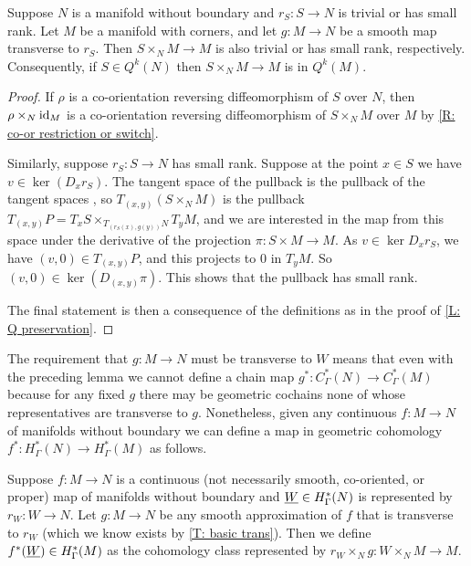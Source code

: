 \begin{lemma}\label{L: pullback map Q}
	Suppose $N$ is a manifold without boundary and $r_S:S \to N$ is trivial or has small rank. Let $M$ be a manifold with corners, and let $g: M \to N$ be a smooth map transverse to $r_S$. Then $S \times_N M \to M$ is also trivial or has small rank, respectively. Consequently, if $S \in Q^k(N)$ then $S \times_N M \to M$ is in $Q^k(M)$.
\end{lemma}

\begin{proof}
	If $\rho$ is a co-orientation reversing diffeomorphism of $S$ over $N$, then $\rho \times_N \mathrm{id}_M$ is a co-orientation reversing diffeomorphism of $S \times_N M$ over $M$ by \cref{R: co-or restriction or switch}.

	Similarly, suppose $r_S:S \to N$ has small rank. Suppose at the point $x \in S$ we have $v \in \ker(D_x r_S)$. The tangent space of the pullback is the pullback of the tangent spaces \cite[Theorem 5.47]{Wed16}, so $T_{(x,y)}(S \times_N M)$ is the pullback $T_{(x,y)}P = T_xS\times_{T_{(r_S(x),g(y))}N} T_y M$, and we are interested in the map from this space under the derivative of the projection $\pi:S \times M \to M$. As $v \in \ker D_xr_S$, we have $(v,0) \in T_{(x,y)}P$, and this projects to $0$ in $T_yM$. So $(v,0) \in \ker(D_{(x,y)}\pi)$. This shows that the pullback has small rank.

	The final statement is then a consequence of the definitions as in the proof of \cref{L: Q preservation}.
\end{proof}

The requirement that $g \colon M \to N$ must be transverse to $W$ means that even with the preceding lemma we cannot define a chain map $g^*:C^*_\Gamma(N) \to C^*_\Gamma(M)$ because for any fixed $g$ there may be geometric cochains none of whose representatives are transverse to $g$. Nonetheless, given any continuous $f \colon M \to N$ of manifolds without boundary we can define a map in geometric cohomology $f^*:H^*_\Gamma(N) \to H^*_\Gamma(M)$ as follows.

\begin{definition}
	Suppose $f \colon M \to N$ is a continuous (not necessarily smooth, co-oriented, or proper) map of manifolds without boundary and $\underline{W} \in H^*_\Gamma(N)$ is represented by $r_W \colon W \to N$. Let $g \colon M \to N$ be any smooth approximation of $f$ that is transverse to $r_W$ (which we know exists by \cref{T: basic trans}). Then we define $f^*(\underline{W}) \in H^*_\Gamma(M)$ as the cohomology class represented by $r_W \times_N g \colon W \times_N M \to M$.
\end{definition}


